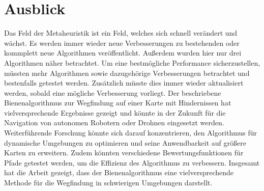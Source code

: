 \section{Ausblick}
Das Feld der Metaheuristik ist ein Feld, welches sich schnell verändert und wächst. Es werden immer wieder neue Verbesserungen zu bestehenden oder kommplett neue Algorithmen veröffentlicht. Außerdem wurden hier nur drei Algorithmen näher betrachtet. Um eine bestmögliche Performance sicherzustellen, müssten mehr Algorithmen sowie dazugehörige Verbesserungen betrachtet und bestenfalls getestet werden. Zusätzlich müsste dies immer wieder aktualisiert werden, sobald eine mögliche Verbesserung vorliegt.
Der beschriebene Bienenalgorithmus zur Wegfindung auf einer Karte mit Hindernissen hat vielversprechende Ergebnisse gezeigt und könnte in der Zukunft für die Navigation von autonomen Robotern oder Drohnen eingesetzt werden. Weiterführende Forschung könnte sich darauf konzentrieren, den Algorithmus für dynamische Umgebungen zu optimieren und seine Anwendbarkeit auf größere Karten zu erweitern. Zudem könnten verschiedene Bewertungsfunktionen für Pfade getestet werden, um die Effizienz des Algorithmus zu verbessern. Insgesamt hat die Arbeit gezeigt, dass der Bienenalgorithmus eine vielversprechende Methode für die Wegfindung in schwierigen Umgebungen darstellt.